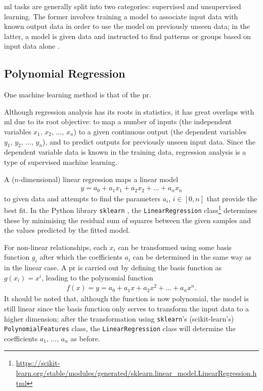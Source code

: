 \ac{ml} tasks are generally split into two categories: supervised and unsupervised learning. The former involves training a model to associate input data with known output data in order to use the model on previously unseen data; in the latter, a model is given data and instructed to find patterns or groups based on input data alone \cite[]{goodfellow_deep_2016,kelleher_fundamentals_2015}.

\subsection{Polynomial Regression} \label{sec:polyreg}
One machine learning method is that of the \ac{pr}.

Although regression analysis has its roots in statistics, it has great overlaps with \ac{ml} due to its root objective: to map a number of inputs (the independent variables \(x_1,\,x_2,\,\ldots,\,x_n\)) to a given continuous output (the dependent variables \(y_1,\,y_2,\,\ldots,\,y_n\)), and to predict outputs for previously unseen input data. Since the dependent variable data is known in the training data, regression analysis is a type of supervised machine learning.

A (\(n\)-dimensional) linear regression maps a linear model
\begin{align}
    y = a_0 + a_1 x_1 + a_2 x_2 + \ldots + a_n x_n
\end{align}
to given data and attempts to find the parameters \(a_i\), \(i \in \left[0, n\right]\) that provide the best fit. In the Python library \texttt{sklearn} \cite[]{scikit-learn}, the \texttt{LinearRegression} class\footnote{\url{https://scikit-learn.org/stable/modules/generated/sklearn.linear_model.LinearRegression.html}} determines these by minimising the residual sum of squares between the given samples and the values predicted by the fitted model.

For non-linear relationships, each \(x_i\) can be transformed using some basis function \(g_i\) after which the coefficients \(a_i\) can be determined in the same way as in the linear case. A \ac{pr} is carried out by defining the basis function as \(g(x_i) = x^i\), leading to the polynomial function
\begin{align}
    f(x) = y = a_0 + a_1 x + a_2 x^2 + \ldots + a_n x^n.
\end{align}
It should be noted that, although the function is now polynomial, the model is still linear since the basis function only serves to transform the input data to a higher dimension; after the transformation using \texttt{sklearn}'s (scikit-learn's) \texttt{PolynomialFeatures} class, the \texttt{LinearRegression} class will determine the coefficients \(a_1,\,\ldots,\,a_n\) as before.

